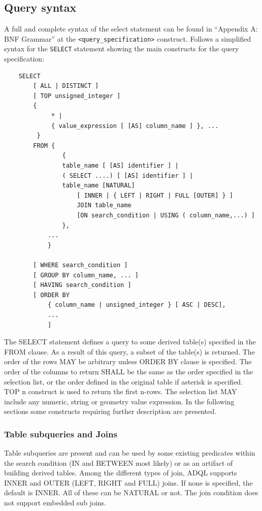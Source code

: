 \documentclass[11pt,a4paper]{ivoa}
\begin{document}
\subsection{Query syntax}

A full and complete syntax of the select statement can be found in “Appendix
A: BNF Grammar” at the \verb:<query_specification>: construct. Follows a simplified
syntax for the \verb:SELECT: statement showing the main constructs for the query
specification:

\begin{verbatim}
    SELECT
        [ ALL | DISTINCT ]
        [ TOP unsigned_integer ]
        {
             * |
             { value_expression [ [AS] column_name ] }, ...
         }
        FROM {
                {
                table_name [ [AS] identifier ] |
                ( SELECT ....) [ [AS] identifier ] |
                table_name [NATURAL]
                    [ INNER | { LEFT | RIGHT | FULL [OUTER] } ]
                    JOIN table_name
                    [ON search_condition | USING ( column_name,...) ]
                },
            ...
            }

        [ WHERE search_condition ]
        [ GROUP BY column_name, ... ]
        [ HAVING search_condition ]
        [ ORDER BY
            { column_name | unsigned_integer } [ ASC | DESC],
            ...
            ]
\end{verbatim}

The SELECT statement defines a query to some derived table(s) specified
in the FROM clause. As a result of this query, a subset of the table(s)
is returned. The order of the rows MAY be arbitrary unless ORDER BY clause
is specified. The order of the columns to return SHALL be the same as the
order specified in the selection list, or the order defined in the original
table if asterisk is specified. TOP n construct is used to return the first
n-rows. The selection list MAY include any numeric, string or geometry value
expression. In the following sections some constructs requiring further
description are presented.

\subsubsection{Table subqueries and Joins}

Table subqueries are present and can be used by some existing predicates
within the search condition (IN and BETWEEN most likely) or as an artifact
of building derived tables. Among the different types of join, ADQL supports
INNER and OUTER (LEFT, RIGHT and FULL) joins. If none is specified, the
default is INNER. All of these can be NATURAL or not. The join condition
does not support embedded sub joins.
\end{document}
